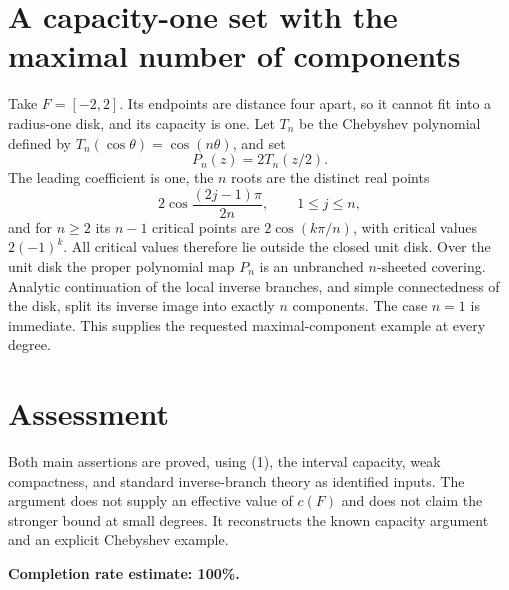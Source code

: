 \documentclass[11pt]{article}
\begin{document}
\section*{A capacity-one set with the maximal number of components}
Take $F=[-2,2]$. Its endpoints are distance four apart, so it cannot fit into a radius-one disk, and its capacity is one. Let $T_n$ be the Chebyshev polynomial defined by $T_n(\cos\theta)=\cos(n\theta)$, and set
\[
 P_n(z)=2T_n(z/2).
\]
The leading coefficient is one, the $n$ roots are the distinct real points
\[
 2\cos\frac{(2j-1)\pi}{2n},\qquad 1\le j\le n,
\]
and for $n\ge2$ its $n-1$ critical points are $2\cos(k\pi/n)$, with critical values $2(-1)^k$. All critical values therefore lie outside the closed unit disk. Over the unit disk the proper polynomial map $P_n$ is an unbranched $n$-sheeted covering. Analytic continuation of the local inverse branches, and simple connectedness of the disk, split its inverse image into exactly $n$ components. The case $n=1$ is immediate. This supplies the requested maximal-component example at every degree.

\section*{Assessment}
Both main assertions are proved, using (1), the interval capacity, weak compactness, and standard inverse-branch theory as identified inputs. The argument does not supply an effective value of $c(F)$ and does not claim the stronger bound at small degrees. It reconstructs the known capacity argument and an explicit Chebyshev example.

\textbf{Completion rate estimate: 100\%.}
\end{document}
